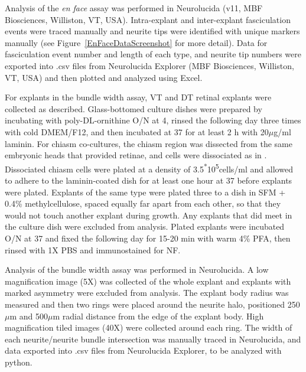 Analysis of the \emph{en face} assay was performed in Neurolucida (v11, MBF Biosciences, Williston, VT, USA).
Intra-explant and inter-explant fasciculation events were traced manually and neurite tips were identified with unique markers manually (see Figure~\ref{EnFaceDataScreenshot} for more detail).
Data for fasciculation event number and length of each type, and neurite tip numbers were exported into .csv files from Neurolucida Explorer (MBF Biosciences, Williston, VT, USA) and then plotted and analyzed using Excel.

For explants in the bundle width assay, VT and DT retinal explants were collected as described.
Glass-bottomed culture dishes were prepared by incubating with poly-DL-ornithine O/N at 4\textcelsius, rinsed the following day three times with cold DMEM/F12, and then incubated at 37\textcelsius{} for at least 2 h with 20$\mu$g/ml laminin.
For chiasm co-cultures, the chiasm region was dissected from the same embryonic heads that provided retinae, and cells were dissociated as in .
Dissociated chiasm cells were plated at a density of 3.5\textsuperscript{*}10\textsuperscript{5}cells/ml and allowed to adhere to the laminin-coated dish for at least one hour at 37\textcelsius{} before explants were plated.
Explants of the same type were plated three to a dish in SFM + 0.4\% methylcellulose, spaced equally far apart from each other, so that they would not touch another explant during growth.
Any explants that did meet in the culture dish were excluded from analysis.
Plated explants were incubated O/N at 37\textcelsius{} and fixed the following day for 15-20 min with warm 4\% PFA, then rinsed with 1X PBS and immunostained for NF.

Analysis of the bundle width assay was performed in Neurolucida.
A low magnification image (5X) was collected of the whole explant and explants with marked asymmetry were excluded from analysis.
The explant body radius was measured and then two rings were placed around the neurite halo, positioned 250$\mu$m and 500$\mu$m radial distance from the edge of the explant body.
High magnification tiled images (40X) were collected around each ring.
The width of each neurite/neurite bundle intersection was manually traced in Neurolucida, and data exported into .csv files from Neurolucida Explorer, to be analyzed with python.

